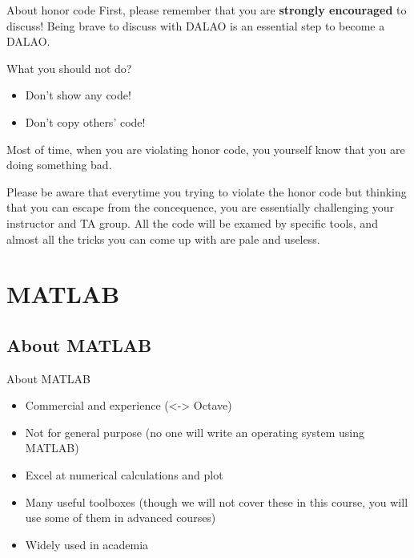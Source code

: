 \documentclass{beamer}
\begin{document}
\begin{frame}{About honor code}
First, please remember that you are \textbf{strongly encouraged} to discuss! Being brave to discuss with DALAO is an essential step to become a DALAO.

\begin{block}{What you should not do?}
\begin{itemize}
    \item Don't show any code! 
    \item Don't copy others' code! 
\end{itemize}
\end{block}
Most of time, when you are violating honor code, you yourself know that you are doing something bad. 

Please be aware that everytime you trying to violate the honor code but thinking that you can escape from the concequence, you are essentially challenging your instructor and TA group. All the code will be examed by specific tools, and almost all the tricks you can come up with are pale and useless. 
\end{frame}

\section{MATLAB}
\subsection{About MATLAB}
\begin{frame}{About MATLAB}
\begin{itemize}
\item Commercial and experience (<-> Octave)
\item Not for general purpose (no one will write an operating system using MATLAB)
\item Excel at numerical calculations and plot
\item Many useful toolboxes (though we will not cover these in this course, you will use some of them in advanced courses)
\item Widely used in academia
\end{itemize}
\end{frame}
\end{document}
